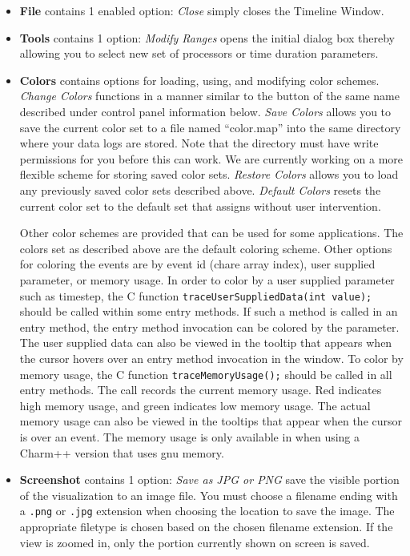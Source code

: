 \documentclass[10pt]{article}
\begin{document}
\begin{itemize}
\item {\bf File} contains 1 enabled option: 
{\it Close} simply closes the Timeline Window.
\item {\bf Tools} contains 1 option: {\it Modify Ranges} opens the initial 
dialog box thereby allowing you to select new set of processors or time duration
parameters.
\item {\bf Colors} contains options for loading, using, and modifying color schemes. {\it Change Colors} functions in
a manner similar to the button of the same name described under control 
panel information below. {\it Save Colors} allows you to save the current
color set to a file named ``color.map'' into the same directory where your
data logs are stored. Note that the directory must have write permissions
for you before this can work. We are currently working on a more flexible
scheme for storing saved color sets. {\it Restore Colors} allows you to
load any previously saved color sets described above. {\it Default Colors}
resets the current color set to the default set that \projections{} assigns
without user intervention.

Other color schemes are provided that can be used for some applications. The colors set as described above are the default coloring scheme. Other options for coloring the events are by event id (chare array index), user supplied parameter, or memory usage. In order to color by a user supplied parameter such as timestep, the C function  \texttt{traceUserSuppliedData(int value);} should be called within some entry methods. If such a method is called in an entry method, the entry method invocation can be colored by the parameter. The user supplied data can also be viewed in the tooltip that appears when the cursor hovers over an entry method invocation in the window. To color by memory usage, the C function \texttt{traceMemoryUsage();} should be called in all entry methods. The call records the current memory usage. Red indicates high memory usage, and green indicates low memory usage. The actual memory usage can also be viewed in the tooltips that appear when the cursor is over an event. The memory usage is only available in when using a Charm++ version that uses gnu memory.


\item {\bf Screenshot} contains 1 option: 
{\it Save as JPG or PNG} save the visible portion of the visualization
to an image file. You must choose a filename ending with a \texttt{.png}
or \texttt{.jpg} extension when choosing the location to save the image. The
appropriate filetype is chosen based on the chosen filename
extension. If the view is zoomed in, only the portion currently shown
on screen is saved.

\end{itemize}
\end{document}
